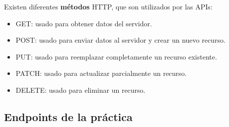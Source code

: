 \documentclass[10pt]{book}
\begin{document}
    Existen diferentes \textbf{métodos} HTTP, que son utilizados por las APIs:
        \begin{itemize}
            \item GET: usado para obtener datos del servidor.
            \item POST: usado para enviar datos al servidor y crear un nuevo recurso.
            \item PUT: usado para reemplazar completamente un recurso existente.
            \item PATCH: usado para actualizar parcialmente un recurso.
            \item DELETE: usado para eliminar un recurso.
        \end{itemize}

    \subsection{Endpoints de la práctica}
\end{document}
